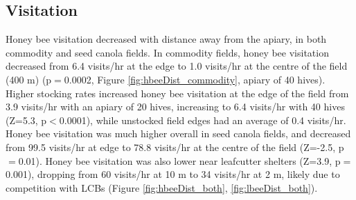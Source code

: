 \documentclass[12pt]{article} %
\begin{document}


\subsection{Visitation}

Honey bee visitation decreased with distance away from the apiary, in both commodity and seed canola fields.
In commodity fields, honey bee visitation decreased from 6.4 visits/hr at the edge to 1.0 visits/hr at the centre of the field (400 m) (p$=$0.0002, Figure \ref{fig:hbeeDist_commodity}, apiary of 40 hives).
Higher stocking rates increased honey bee visitation at the edge of the field from 3.9 visits/hr with an apiary of 20 hives, increasing to 6.4 visits/hr with 40 hives (Z=5.3, p$<$0.0001), while unstocked field edges had an average of 0.4 visits/hr.
Honey bee visitation was much higher overall in seed canola fields, and decreased from 99.5 visits/hr at edge to 78.8 visits/hr at the centre of the field (Z=-2.5, p$=$0.01). 
Honey bee visitation was also lower near leafcutter shelters (Z=3.9, p$=$0.001), dropping from 60 visits/hr at 10 m to 34 visits/hr at 2 m, likely due to competition with LCBs (Figure \ref{fig:hbeeDist_both}, \ref{fig:lbeeDist_both}).
\end{document}
